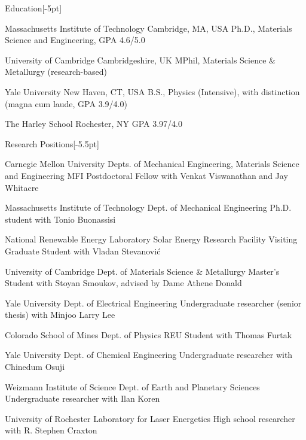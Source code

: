 \documentclass{cv} %
\begin{document}
\thispagestyle{empty}
\begin{cvSection}{Education}[-5pt]

     {Massachusetts Institute of Technology}
     {Cambridge, MA, USA}
     {Ph.D., Materials Science and Engineering, GPA 4.6/5.0}

     {University of Cambridge}
     {Cambridgeshire, UK}
     {MPhil, Materials Science \& Metallurgy (research-based)}

     {Yale University}
     {New Haven, CT, USA}
     {B.S., Physics (Intensive), with distinction (magna cum laude, GPA 3.9/4.0)}

     {The Harley School}
     {Rochester, NY}
     {GPA 3.97/4.0}

\end{cvSection}

\begin{cvSection}{Research Positions}[-5.5pt]

    {Carnegie Mellon University}
    {Depts. of Mechanical Engineering, Materials \newline Science and Engineering}
    {MFI Postdoctoral Fellow with Venkat Viswanathan and Jay Whitacre}

    {Massachusetts Institute of Technology}
    {Dept. of Mechanical Engineering}
    {Ph.D. student with Tonio Buonassisi}

    {National Renewable Energy Laboratory}
    {Solar Energy Research Facility}
    {Visiting Graduate Student with Vladan Stevanovi\'c}

    {University of Cambridge}
    {Dept. of Materials Science \& Metallurgy}
    {Master's Student with Stoyan Smoukov, advised by Dame Athene Donald}

    {Yale University}
    {Dept. of Electrical Engineering}
    {Undergraduate researcher (senior thesis) with Minjoo Larry Lee}

    {Colorado School of Mines}
    {Dept. of Physics}
    {REU Student with Thomas Furtak}

    {Yale University}
    {Dept. of Chemical Engineering}
    {Undergraduate researcher with Chinedum Osuji}

    {Weizmann Institute of Science}
    {Dept. of Earth and Planetary Sciences}
    {Undergraduate researcher with Ilan Koren}

    {University of Rochester}
    {Laboratory for Laser Energetics}
    {High school researcher with R. Stephen Craxton}

\end{cvSection}
\end{document}

